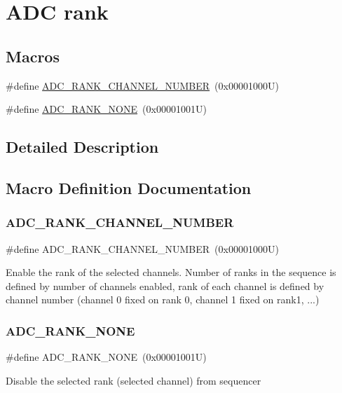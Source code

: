 \hypertarget{group___a_d_c__rank}{}\section{A\+DC rank}
\label{group___a_d_c__rank}
\subsection*{Macros}
\begin{DoxyCompactItemize}
\item 
\#define \hyperlink{group___a_d_c__rank_ga25907c7d81b72261eff9adc6e9726690}{A\+D\+C\+\_\+\+R\+A\+N\+K\+\_\+\+C\+H\+A\+N\+N\+E\+L\+\_\+\+N\+U\+M\+B\+ER}~(0x00001000\+U)
\item 
\#define \hyperlink{group___a_d_c__rank_gace464dc0c5d9a401d2842f7f1629d5cd}{A\+D\+C\+\_\+\+R\+A\+N\+K\+\_\+\+N\+O\+NE}~(0x00001001\+U)
\end{DoxyCompactItemize}


\subsection{Detailed Description}


\subsection{Macro Definition Documentation}
\mbox{\label{group___a_d_c__rank_ga25907c7d81b72261eff9adc6e9726690}} 
\subsubsection{\texorpdfstring{A\+D\+C\+\_\+\+R\+A\+N\+K\+\_\+\+C\+H\+A\+N\+N\+E\+L\+\_\+\+N\+U\+M\+B\+ER}{ADC\_RANK\_CHANNEL\_NUMBER}}
{\footnotesize\ttfamily \#define A\+D\+C\+\_\+\+R\+A\+N\+K\+\_\+\+C\+H\+A\+N\+N\+E\+L\+\_\+\+N\+U\+M\+B\+ER~(0x00001000\+U)}

Enable the rank of the selected channels. Number of ranks in the sequence is defined by number of channels enabled, rank of each channel is defined by channel number (channel 0 fixed on rank 0, channel 1 fixed on rank1, ...) \mbox{\label{group___a_d_c__rank_gace464dc0c5d9a401d2842f7f1629d5cd}} 
\subsubsection{\texorpdfstring{A\+D\+C\+\_\+\+R\+A\+N\+K\+\_\+\+N\+O\+NE}{ADC\_RANK\_NONE}}
{\footnotesize\ttfamily \#define A\+D\+C\+\_\+\+R\+A\+N\+K\+\_\+\+N\+O\+NE~(0x00001001\+U)}

Disable the selected rank (selected channel) from sequencer 